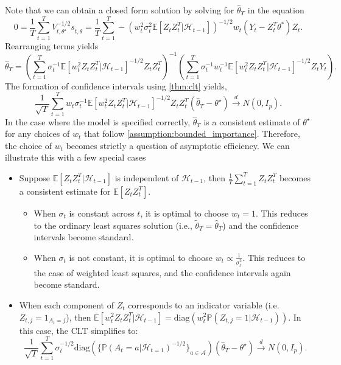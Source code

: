 \documentclass[11pt]{article}
\newcommand{\diag}{\text{diag}}
\newcommand{\E}{\mathbb{E}}
\begin{document}
Note that we can obtain a closed form solution by solving for $\hat{\theta}_{T}$ in the equation $$0=\frac{1}{T}\sum_{t=1}^{T} V_{t,\theta^{\star}}^{-1/2} s_{t,\hat{\theta}} =\frac{1}{T}\sum_{t=1}^{T}-\left(w_{t}^{2}\sigma_{t}^{2} \E \left[Z_{t}Z_{t}^{T} |\mathcal{H}_{t-1} \right]\right)^{-1/2}w_{t}(Y_{t} - Z_{t}^{T}\theta^{*} )Z_{t}.$$ Rearranging terms yields
$$\hat{\theta}_{T}= \left(\sum_{t=1}^{T} \sigma_{t}^{-1}\E \left[w_{t}^{2}Z_{t}Z_{t}^{T} |\mathcal{H}_{t-1} \right]^{-1/2} Z_{t}Z_{t}^{T}\right)^{-1} \left(\sum_{t=1}^{T}\sigma_{t}^{-1}w_t^{-1}\E \left[w_{t}^{2}Z_{t}Z_{t}^{T} |\mathcal{H}_{t-1} \right]^{-1/2} Z_{t}Y_{t}\right).$$
The formation of confidence intervals using \cref{thm:clt} yields, 
$$\frac{1}{\sqrt{T}}\sum_{t=1}^{T} w_{t} \sigma_{t}^{-1} \E \left[w_{t}^{2}Z_{t}Z_{t}^{T} |\mathcal{H}_{t-1} \right]^{-1/2} Z_{t}Z_{t}^{T} \left(  \hat{\theta}_{T}- \theta^{\star}\right) \overset{d}{\to} N(0,I_{p}).$$
In the case where the model is specified correctly, $\hat{\theta}_{T}$ is a consistent estimate of $\theta^{\star}$ for any choices of $w_{t}$ that follow \cref{assumption:bounded_importance}. Therefore, the choice of $w_{t}$ becomes strictly a question of asymptotic efficiency. We can illustrate this with a few special cases
\begin{itemize}
  \item Suppose $\E \left[Z_{t}Z_{t}^{T} |\mathcal{H}_{t-1} \right]$ is independent of $\mathcal{H}_{t-1}$, then $\frac{1}{T}\sum_{t=1}^{T} Z_{t}Z_{t}^{T}$ becomes a consistent estimate for $\E \left[Z_{t}Z_{t}^{T}\right]$. 
  \begin{itemize}
      \item When $\sigma_{t}$ is constant across $t$, it is optimal to choose $w_{t} = 1$. This reduces to the ordinary least squares solution (i.e., $\tilde{\theta}_{T}= \hat{\theta}_{T}$) and the confidence intervals become standard.
      \item  When $\sigma_{t}$ is not constant, it is optimal to choose $w_{t} \propto \frac{1}{\sigma_t^{2}}$. This reduces to the case of weighted least squares, and the confidence intervals again become standard. 
  \end{itemize}
  \item When each component of $Z_{t}$ corresponds to an indicator variable (i.e. $Z_{t,j} = 1_{A_t =j}$), then $\E \left[w_{t}^{2}Z_{t}Z_{t}^{T} |\mathcal{H}_{t-1} \right] = \diag\left(w_{t}^{2}\mathbb{P}\left(Z_{t,j} = 1 | \mathcal{H}_{t-1} \right)\right)$. In this case, the CLT simplifies to:
  $$\frac{1}{\sqrt{T}}\sum_{t=1}^{T} \sigma_{t}^{-1/2}\text{diag}\left(\{\mathbb{P}(A_{t} = a|\mathcal{H}_{t=1})^{-1/2}\}_{a \in \mathcal{A}}\right)\left(  \hat{\theta}_{T}- \theta^{\star}\right)  \overset{d}{\to} N(0,I_{p}).$$

\end{itemize}
\end{document}
